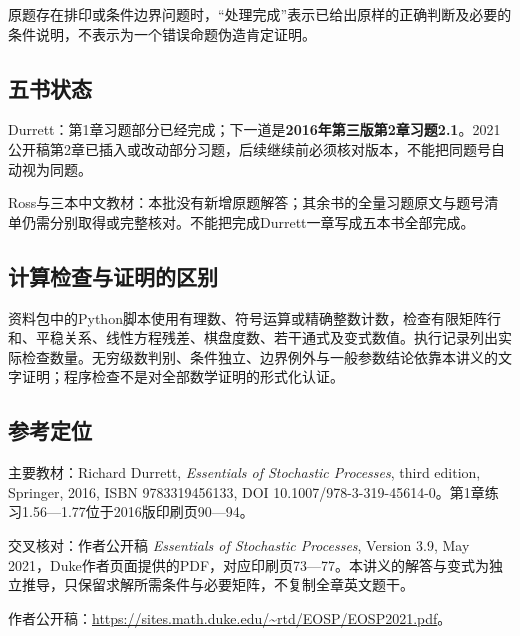 \documentclass[
  11pt,a4paper,UTF8,fontset=fandol]{ctexart}
\begin{document}
原题存在排印或条件边界问题时，``处理完成''表示已给出原样的正确判断及必要的条件说明，不表示为一个错误命题伪造肯定证明。

\subsection{五书状态}\label{ux4e94ux4e66ux72b6ux6001}

Durrett：第1章习题部分已经完成；下一道是\textbf{2016年第三版第2章习题2.1}。2021公开稿第2章已插入或改动部分习题，后续继续前必须核对版本，不能把同题号自动视为同题。

Ross与三本中文教材：本批没有新增原题解答；其余书的全量习题原文与题号清单仍需分别取得或完整核对。不能把完成Durrett一章写成五本书全部完成。

\subsection{计算检查与证明的区别}\label{ux8ba1ux7b97ux68c0ux67e5ux4e0eux8bc1ux660eux7684ux533aux522b}

资料包中的Python脚本使用有理数、符号运算或精确整数计数，检查有限矩阵行和、平稳关系、线性方程残差、棋盘度数、若干通式及变式数值。执行记录列出实际检查数量。无穷级数判别、条件独立、边界例外与一般参数结论依靠本讲义的文字证明；程序检查不是对全部数学证明的形式化认证。

\subsection{参考定位}\label{ux53c2ux8003ux5b9aux4f4d}

主要教材：Richard Durrett, \emph{Essentials of Stochastic Processes},
third edition, Springer, 2016, ISBN 9783319456133, DOI
10.1007/978-3-319-45614-0。第1章练习1.56---1.77位于2016版印刷页90---94。

交叉核对：作者公开稿 \emph{Essentials of Stochastic Processes}, Version
3.9, May
2021，Duke作者页面提供的PDF，对应印刷页73---77。本讲义的解答与变式为独立推导，只保留求解所需条件与必要矩阵，不复制全章英文题干。

作者公开稿：\url{https://sites.math.duke.edu/~rtd/EOSP/EOSP2021.pdf}。
\end{document}
